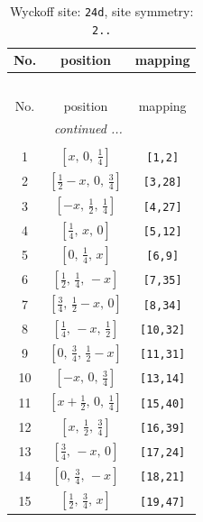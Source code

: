 \documentclass[fleqn,8pt]{jsarticle}
\begin{document}
\renewcommand{\arraystretch}{1.2}
\begin{longtable}{ccc}
\caption{Wyckoff site: {\tt 24d}, site symmetry: {\tt 2..}}
 \\
 \hline \hline
No. & position & mapping \\ \hline \endfirsthead

\multicolumn{2}{l}{\tablename\ \thetable{}} \\
 \hline \hline
No. & position & mapping \\ \hline \endhead

 \hline \hline
\multicolumn{2}{r}{\footnotesize\it continued ...} \\ \endfoot

 \hline \hline
\multicolumn{2}{r}{} \\ \endlastfoot

1 & $\left[ x,\, 0,\, \frac{1}{4} \right]$ & {\tt [1,2]} \\ \hline
2 & $\left[ \frac{1}{2} - x,\, 0,\, \frac{3}{4} \right]$ & {\tt [3,28]} \\ \hline
3 & $\left[ - x,\, \frac{1}{2},\, \frac{1}{4} \right]$ & {\tt [4,27]} \\ \hline
4 & $\left[ \frac{1}{4},\, x,\, 0 \right]$ & {\tt [5,12]} \\ \hline
5 & $\left[ 0,\, \frac{1}{4},\, x \right]$ & {\tt [6,9]} \\ \hline
6 & $\left[ \frac{1}{2},\, \frac{1}{4},\, - x \right]$ & {\tt [7,35]} \\ \hline
7 & $\left[ \frac{3}{4},\, \frac{1}{2} - x,\, 0 \right]$ & {\tt [8,34]} \\ \hline
8 & $\left[ \frac{1}{4},\, - x,\, \frac{1}{2} \right]$ & {\tt [10,32]} \\ \hline
9 & $\left[ 0,\, \frac{3}{4},\, \frac{1}{2} - x \right]$ & {\tt [11,31]} \\ \hline
10 & $\left[ - x,\, 0,\, \frac{3}{4} \right]$ & {\tt [13,14]} \\ \hline
11 & $\left[ x + \frac{1}{2},\, 0,\, \frac{1}{4} \right]$ & {\tt [15,40]} \\ \hline
12 & $\left[ x,\, \frac{1}{2},\, \frac{3}{4} \right]$ & {\tt [16,39]} \\ \hline
13 & $\left[ \frac{3}{4},\, - x,\, 0 \right]$ & {\tt [17,24]} \\ \hline
14 & $\left[ 0,\, \frac{3}{4},\, - x \right]$ & {\tt [18,21]} \\ \hline
15 & $\left[ \frac{1}{2},\, \frac{3}{4},\, x \right]$ & {\tt [19,47]} \\ \hline

\end{longtable}
\end{document}
